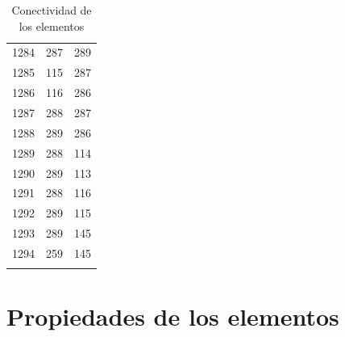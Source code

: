 \documentclass[a4paper,11pt]{article}
\begin{document}
\begin{center}
\begin{longtable}{|R{1.5cm}|R{1.5cm}|R{1.5cm}|}
 1284 &  287 &  289 \\
 1285 &  115 &  287 \\
 1286 &  116 &  286 \\
 1287 &  288 &  287 \\
 1288 &  289 &  286 \\
 1289 &  288 &  114 \\
 1290 &  289 &  113 \\
 1291 &  288 &  116 \\
 1292 &  289 &  115 \\
 1293 &  289 &  145 \\
 1294 &  259 &  145 \\
\bottomrule[0.8mm]                               
\caption{Conectividad de los elementos }             
\end{longtable}                                  
\end{center}                                     

\newpage       

\section{Propiedades de los elementos} 
\end{document}
